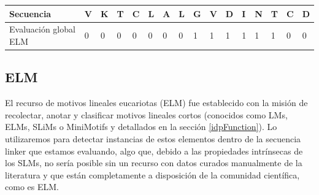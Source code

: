 \vspace{0.5cm}
\begin{tabular}{llllllllllllllll} 
\hline
Secuencia & \textbf{V} & \textbf{K} & \textbf{T} & \textbf{C} & \textbf{L} & \textbf{A} & \textbf{L} & \textbf{G} & \textbf{V} & \textbf{D} & \textbf{I} & \textbf{N} & \textbf{T} & \textbf{C} & \textbf{D}\\ \hline
Evaluación global ELM & 0 & 0 & 0 & 0 & 0 & 0 & 0 & 1 & 1 & 1 & 1 & 1 & 1 & 0 & 0 \\ \hline
\end{tabular}























\subsection{ELM}\label{elm}

El recurso de motivos lineales eucariotas (ELM) \cite{puntervoll2003elm,dinkel2013eukaryotic} fue establecido con la misión de recolectar, anotar y clasificar motivos lineales cortos 
(conocidos como LMs, ELMs, SLiMs o MiniMotifs y detallados en la sección \ref{idpFunction}). 
Lo utilizaremos para detectar instancias de estos elementos dentro de la secuencia linker que estamos evaluando, algo que, debido a las propiedades intrínsecas de los SLMs, no sería posible sin un recurso 
con datos curados manualmente de la literatura y que están completamente a disposición de la comunidad científica, como es ELM.


